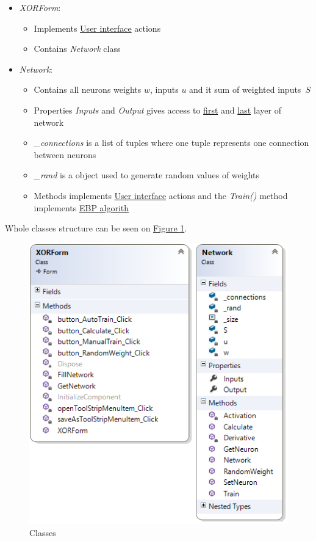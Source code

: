 \begin{itemize}[topsep=1pt,itemsep=-1ex,partopsep=1ex,parsep=1ex]
    \item \textit{XORForm}:
    \begin{itemize}[topsep=0pt,itemsep=-1ex,partopsep=1ex,parsep=1ex]
        \item Implements \hyperref[UserInterface]{User interface} actions
        \item Contains \textit{Network} class 
    \end{itemize}
    \item \textit{Network}:
    \begin{itemize}[topsep=0pt,itemsep=-1ex,partopsep=1ex,parsep=1ex]
        \item Contains all neurons weights $w$, inputs $u$ and it sum of weighted inputs~$S$
        \item Properties \textit{Inputs} and \textit{Output} gives access to \hyperref[InputLayer]{first} and \hyperref[OutputLayer]{last} layer of network
        \item \textit{\_connections} is a list of tuples where one tuple represents one connection between neurons
        \item \textit{\_rand} is a object used to generate random values of weights
        \item Methods implements \hyperref[UserInterface]{User interface} actions and the \textit{Train()} method implements \hyperref[formula:EBP]{EBP algorith}
    \end{itemize}
\end{itemize}

Whole classes structure can be seen on \hyperref[fig:Classes]{Figure \ref{fig:Classes}}.

\begin{figure}[!h]
    \centering
    \includegraphics[scale=1]{Media/Class.png}
    \caption{Classes}
    \label{fig:Classes}
\end{figure}